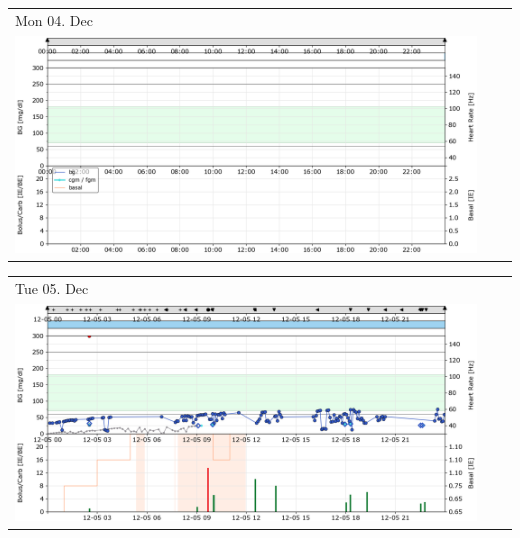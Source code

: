 \newpage

\begin{tabularx}{\linewidth}{YYY}
Mon 04. Dec\\
\includegraphics[scale=0.53,keepaspectratio,trim={0 0 0 0},clip]{plot_daily_171204.png}
\end{tabularx}

\begin{tabularx}{\linewidth}{YYY}
Tue 05. Dec\\
\includegraphics[scale=0.53,keepaspectratio,trim={0 0 0 0},clip]{plot_daily_171205.png}
\end{tabularx}

